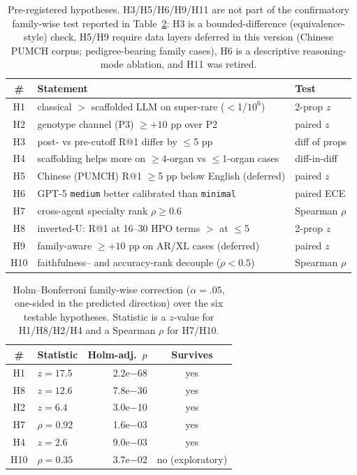 \documentclass[letterpaper]{article} %
\begin{document}
\begin{table}[t]
\centering
\scriptsize
\setlength{\tabcolsep}{4pt}
\caption{Pre-registered hypotheses. H3/H5/H6/H9/H11 are not part of the
confirmatory family-wise test reported in Table~\ref{tab:holm}: H3 is a
bounded-difference (equivalence-style) check, H5/H9 require data layers deferred
in this version (Chinese PUMCH corpus; pedigree-bearing family cases), H6 is a
descriptive reasoning-mode ablation, and H11 was retired.}
\label{tab:hyp}
\begin{tabular}{@{}cll@{}}
\toprule
\# & Statement & Test \\
\midrule
H1 & classical $>$ scaffolded LLM on super-rare ($<$1/$10^6$) & 2-prop $z$ \\
H2 & genotype channel (P3) $\geq +10$ pp over P2 & paired $z$ \\
H3 & post- vs pre-cutoff R@1 differ by $\leq$5 pp & diff of props \\
H4 & scaffolding helps more on $\geq$4-organ vs $\leq$1-organ cases & diff-in-diff \\
H5 & Chinese (PUMCH) R@1 $\geq$5 pp below English (deferred) & paired $z$ \\
H6 & GPT-5 \texttt{medium} better calibrated than \texttt{minimal} & paired ECE \\
H7 & cross-agent specialty rank $\rho \geq 0.6$ & Spearman $\rho$ \\
H8 & inverted-U: R@1 at 16--30 HPO terms $>$ at $\leq$5 & 2-prop $z$ \\
H9 & family-aware $\geq +10$ pp on AR/XL cases (deferred) & paired $z$ \\
H10 & faithfulness-- and accuracy-rank decouple ($\rho<0.5$) & Spearman $\rho$ \\
\bottomrule
\end{tabular}
\end{table}

\begin{table}[h]
\centering
\scriptsize
\setlength{\tabcolsep}{4pt}
\caption{Holm--Bonferroni family-wise correction ($\alpha{=}.05$, one-sided in
the predicted direction) over the six testable hypotheses. Statistic is a
$z$-value for H1/H8/H2/H4 and a Spearman $\rho$ for H7/H10.}
\label{tab:holm}
\begin{tabular}{@{}clrc@{}}
\toprule
\# & Statistic & Holm-adj.\ $p$ & Survives \\
\midrule
H1 & $z=17.5$ & 2.2e$-$68 & yes \\
H8 & $z=12.6$ & 7.8e$-$36 & yes \\
H2 & $z=6.4$ & 3.0e$-$10 & yes \\
H7 & $\rho=0.92$ & 1.6e$-$03 & yes \\
H4 & $z=2.6$ & 9.0e$-$03 & yes \\
H10 & $\rho=0.35$ & 3.7e$-$02 & no (exploratory) \\
\bottomrule
\end{tabular}
\end{table}
\end{document}

